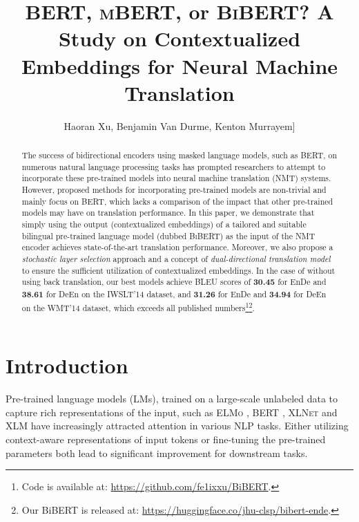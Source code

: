 \documentclass[11pt]{article}
\title{\textsc{BERT}, \textsc{mBERT}, or \textsc{BiBERT}? A Study on Contextualized Embeddings for Neural Machine Translation }
\author{Haoran Xu, Benjamin Van Durme,  Kenton Murray\1em]
}
\date{}
\begin{document}
\maketitle
\begin{abstract}
The success of bidirectional encoders using masked language models, such as  \textsc{BERT}, on numerous natural language processing tasks has prompted researchers to attempt to incorporate these pre-trained models into neural machine translation (NMT) systems. However, proposed methods for incorporating pre-trained models are non-trivial and mainly focus on BERT, which lacks a comparison of the impact that other pre-trained models may have on translation performance. In this paper, we demonstrate that simply using the output (contextualized embeddings) of a tailored and suitable bilingual pre-trained language model (dubbed \textsc{BiBERT}) as the input of the NMT encoder achieves state-of-the-art translation performance. Moreover, we also propose a \textit{stochastic layer selection} approach and a concept of \textit{dual-directional translation model} to ensure the sufficient utilization of contextualized embeddings. In the case of without using back translation, our best models achieve BLEU scores of \textbf{30.45} for EnDe and \textbf{38.61} for DeEn on the IWSLT'14 dataset, and \textbf{31.26} for EnDe and \textbf{34.94} for DeEn on the WMT'14 dataset,  which exceeds all published numbers\footnote{Code is available at: \url{https://github.com/fe1ixxu/BiBERT}.}\footnote{Our BiBERT is released at: \url{https://huggingface.co/jhu-clsp/bibert-ende}.}. 
\end{abstract}

\section{Introduction}
Pre-trained language models (LMs), trained on a large-scale unlabeled data to capture rich representations of the input, such as \textsc{ELMo} \citep{peters-etal-2018-deep}, \textsc{BERT} \citep{devlin-etal-2019-bert}, \textsc{XLNet} \citep{NEURIPS2019_dc6a7e65} and \textsc{XLM} \citep{NEURIPS2019_c04c19c2} have increasingly attracted attention in various NLP tasks. Either utilizing context-aware representations of input tokens \citep{peters-etal-2018-deep} or fine-tuning the pre-trained parameters \citep{devlin-etal-2019-bert} both lead to significant improvement for downstream tasks. 
\end{document}
